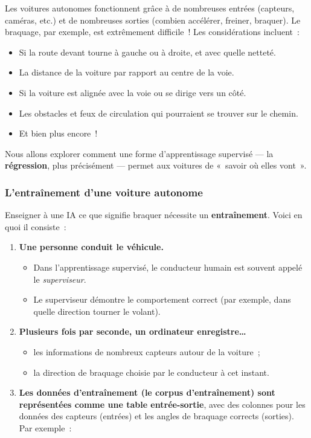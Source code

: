 \documentclass[12pt,a4paper]{article}
\begin{document}
\begin{keypointbox}
  Les voitures autonomes fonctionnent grâce à de nombreuses entrées (capteurs, caméras, etc.) et de nombreuses sorties (combien accélérer, freiner, braquer). Le braquage, par exemple, est extrêmement difficile~! Les considérations incluent~:
  \begin{itemize}
    \item Si la route devant tourne à gauche ou à droite, et avec quelle netteté.
    \item La distance de la voiture par rapport au centre de la voie.
    \item Si la voiture est alignée avec la voie ou se dirige vers un côté.
    \item Les obstacles et feux de circulation qui pourraient se trouver sur le chemin.
    \item Et bien plus encore~!
  \end{itemize}

  Nous allons explorer comment une forme d'apprentissage supervisé — la \textbf{régression}, plus précisément — permet aux voitures de «~savoir où elles vont~».
\end{keypointbox}

\subsubsection{L'entraînement d'une voiture autonome}

Enseigner à une IA ce que signifie braquer nécessite un \textbf{entraînement}. Voici en quoi il consiste~:

\begin{enumerate}[leftmargin=*]
  \item \textbf{Une personne conduit le véhicule.}
  \begin{itemize}
    \item Dans l'apprentissage supervisé, le conducteur humain est souvent appelé le \emph{superviseur}.
    \item Le superviseur démontre le comportement correct (par exemple, dans quelle direction tourner le volant).
  \end{itemize}
  \item \textbf{Plusieurs fois par seconde, un ordinateur enregistre…}
  \begin{itemize}
    \item les informations de nombreux capteurs autour de la voiture~;
    \item la direction de braquage choisie par le conducteur à cet instant.
  \end{itemize}
  \item \textbf{Les données d'entraînement (le corpus d'entraînement) sont représentées comme une table entrée-sortie}, avec des colonnes pour les données des capteurs (entrées) et les angles de braquage corrects (sorties). Par exemple~:
\end{enumerate}
\end{document}
